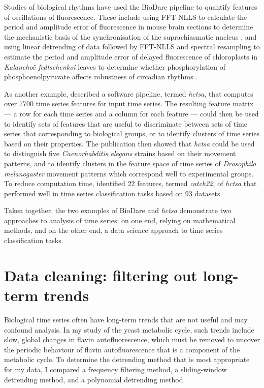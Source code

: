 Studies of biological rhythms have used the BioDare pipeline to quantify features of oscillations of fluorescence.
These include using FFT-NLLS to calculate the period and amplitude error of fluorescence in mouse brain sections to determine the mechanistic basis of the synchronisation of the suprachiasmatic nucleus \parencite{hamnettVasoactiveIntestinalPeptide2019}, and using linear detrending of data followed by FFT-NLLS and spectral resampling to estimate the period and amplitude error of delayed fluorescence of chloroplasts in \textit{Kalancho\"{e} fedtschenkoi} leaves to determine whether phosphorylation of phosphoenolpyruvate affects robustness of circadian rhythms \parencite{boxallPhosphorylationPhosphoenolpyruvateCarboxylase2017}.

As another example, \textcite{fulcherHctsaComputationalFramework2017} described a software pipeline, termed \textit{hctsa}, that computes over 7700 time series features for input time series.
The resulting feature matrix --- a row for each time series and a column for each feature --- could then be used to identify sets of features that are useful to discriminate between sets of time series that corresponding to biological groups, or to identify clusters of time series based on their properties.
The publication then showed that \textit{hctsa} could be used to distinguish five \textit{Caenorhabditis elegans} strains based on their movement patterns, and to identify clusters in the feature space of time series of \textit{Drosophila melanogaster} movement patterns which correspond well to experimental groups.
To reduce computation time, \textcite{lubbaCatch22CAnonicalTimeseries2019} identified 22 features, termed \textit{catch22}, of \textit{hctsa} that performed well in time series classification tasks based on 93 datasets.

Taken together, the two examples of BioDare and \textit{hctsa} demonstrate two approaches to analysis of time series: on one end, relying on mathematical methods, and on the other end, a data science approach to time series classification tasks.


\section{Data cleaning: filtering out long-term trends}
\label{sec:analysis-cleaning}

Biological time series often have long-term trends that are not useful and may confound analysis.
In my study of the yeast metabolic cycle, such trends include slow, global changes in flavin autofluorescence, which must be removed to uncover the periodic behaviour of flavin autofluorescence that is a component of the metabolic cycle.
To determine the detrending method that is most appropriate for my data, I compared a frequency filtering method, a sliding-window detrending method, and a polynomial detrending method.

